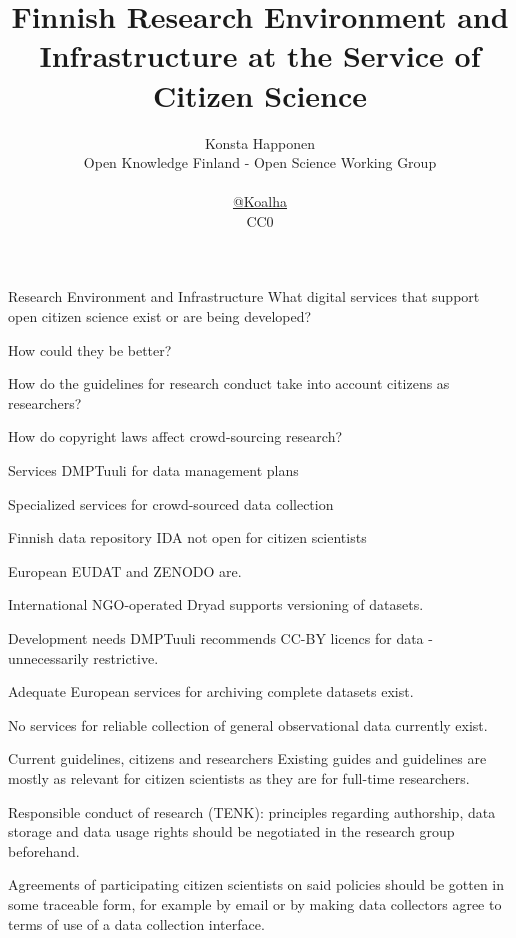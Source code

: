 \documentclass{beamer}
\title{Finnish Research Environment and Infrastructure at the Service of Citizen Science}
\author{\parbox{\textwidth}{Konsta Happonen\\
    Open Knowledge Finland - Open Science Working Group\\
    \\
    \href{http://twitter.com/koalha}{@Koalha}\\
    CC0
}}
\date{}
\begin{document}
\maketitle



\begin{frame}{Research Environment and Infrastructure}
  What digital services that support open citizen science exist or are being developed?
%
%
%

  How could they be better?

  How do the guidelines for research conduct take into account citizens as researchers?

  How do copyright laws affect crowd-sourcing research?

\end{frame}


\begin{frame}{Services}
  DMPTuuli for data management plans

  Specialized services for crowd-sourced data collection

  Finnish data repository IDA not open for citizen scientists

  European EUDAT and ZENODO are.

  International NGO-operated Dryad supports versioning of datasets. 
\end{frame}


\begin{frame}{Development needs}
  DMPTuuli recommends CC-BY licencs for data - unnecessarily restrictive.

  Adequate European services for archiving complete datasets exist.

  No services for reliable collection of general observational data currently exist.
\end{frame}


\begin{frame}{Current guidelines, citizens and researchers}
  Existing guides and guidelines are mostly as relevant for citizen scientists as they are for full-time researchers. 

  Responsible conduct of research (TENK): principles regarding authorship, data storage and data usage rights should be negotiated in the research group beforehand. %

  Agreements of participating citizen scientists on said policies should be gotten in some traceable form, for example by email or by making data collectors agree to terms of use of a data collection interface.
\end{frame}
\end{document}
